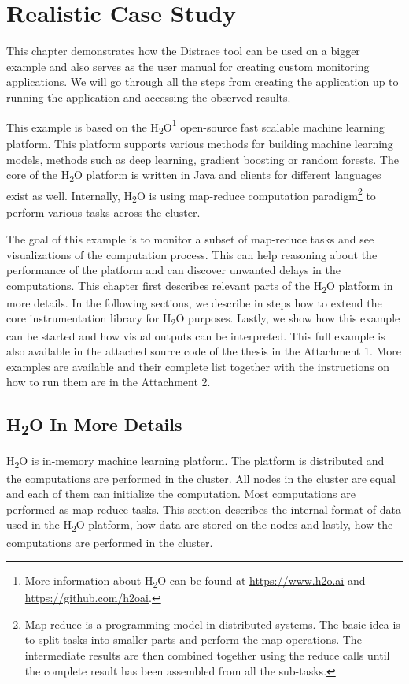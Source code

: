 \chapter{Realistic Case Study}
\label{chap:big_example}
This chapter demonstrates how the Distrace tool can be used on a bigger example and also serves as the user manual for creating custom monitoring applications. We will go through all the steps from creating the application up to running the application and accessing the observed results.

This example is based on the H\textsubscript{2}O\footnote{More information about H\textsubscript{2}O can be found at \url{https://www.h2o.ai} and \url{https://github.com/h2oai}.} open-source fast scalable machine learning platform. This platform supports various methods for building machine learning models, methods such as deep learning, gradient boosting or random forests. The core of the H\textsubscript{2}O platform is written in Java and clients for different languages exist as well. Internally, H\textsubscript{2}O is using map-reduce computation paradigm\footnote{Map-reduce is a programming model in distributed systems. The basic idea is to split tasks into smaller parts and perform the map operations. The intermediate results are then combined together using the reduce calls until the complete result has been assembled from all the sub-tasks.} to perform various tasks across the cluster.

The goal of this example is to monitor a subset of map-reduce tasks and see visualizations of the computation process. This can help reasoning about the performance of the platform and can discover unwanted delays in the computations. This chapter first describes relevant parts of the H\textsubscript{2}O platform in more details. In the following sections, we describe in steps how to extend the core instrumentation library for H\textsubscript{2}O purposes. Lastly, we show how this example can be started and how visual outputs can be interpreted. 
This full example is also available in the attached source code of the thesis in the Attachment 1. More examples are available and their complete list together with the instructions on how to run them are in the Attachment 2.

\section{H\textsubscript{2}O In More Details}
H\textsubscript{2}O is in-memory machine learning platform. The platform is distributed and the computations are performed in the cluster. All nodes in the cluster are equal and each of them can initialize the computation. Most computations are performed as map-reduce tasks. This section describes the internal format of data used in the H\textsubscript{2}O platform, how data are stored on the nodes and lastly, how the computations are performed in the cluster. 

